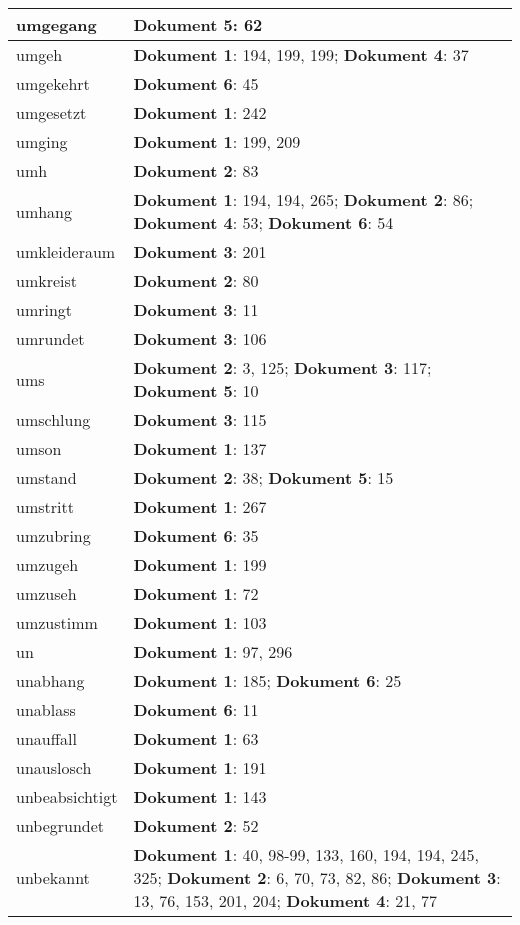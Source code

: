 \documentclass[a5paper]{article}
\begin{document}
\begin{longtable}[l]{|l|p{3in}|}
\hline
umgegang & \textbf{Dokument 5}: 62 \\
\hline
umgeh & \textbf{Dokument 1}: 194, 199, 199; \textbf{Dokument 4}: 37 \\
\hline
umgekehrt & \textbf{Dokument 6}: 45 \\
\hline
umgesetzt & \textbf{Dokument 1}: 242 \\
\hline
umging & \textbf{Dokument 1}: 199, 209 \\
\hline
umh & \textbf{Dokument 2}: 83 \\
\hline
umhang & \textbf{Dokument 1}: 194, 194, 265; \textbf{Dokument 2}: 86; \textbf{Dokument 4}: 53; \textbf{Dokument 6}: 54 \\
\hline
umkleideraum & \textbf{Dokument 3}: 201 \\
\hline
umkreist & \textbf{Dokument 2}: 80 \\
\hline
umringt & \textbf{Dokument 3}: 11 \\
\hline
umrundet & \textbf{Dokument 3}: 106 \\
\hline
ums & \textbf{Dokument 2}: 3, 125; \textbf{Dokument 3}: 117; \textbf{Dokument 5}: 10 \\
\hline
umschlung & \textbf{Dokument 3}: 115 \\
\hline
umson & \textbf{Dokument 1}: 137 \\
\hline
umstand & \textbf{Dokument 2}: 38; \textbf{Dokument 5}: 15 \\
\hline
umstritt & \textbf{Dokument 1}: 267 \\
\hline
umzubring & \textbf{Dokument 6}: 35 \\
\hline
umzugeh & \textbf{Dokument 1}: 199 \\
\hline
umzuseh & \textbf{Dokument 1}: 72 \\
\hline
umzustimm & \textbf{Dokument 1}: 103 \\
\hline
un & \textbf{Dokument 1}: 97, 296 \\
\hline
unabhang & \textbf{Dokument 1}: 185; \textbf{Dokument 6}: 25 \\
\hline
unablass & \textbf{Dokument 6}: 11 \\
\hline
unauffall & \textbf{Dokument 1}: 63 \\
\hline
unauslosch & \textbf{Dokument 1}: 191 \\
\hline
unbeabsichtigt & \textbf{Dokument 1}: 143 \\
\hline
unbegrundet & \textbf{Dokument 2}: 52 \\
\hline
unbekannt & \textbf{Dokument 1}: 40, 98-99, 133, 160, 194, 194, 245, 325; \textbf{Dokument 2}: 6, 70, 73, 82, 86; \textbf{Dokument 3}: 13, 76, 153, 201, 204; \textbf{Dokument 4}: 21, 77 \\

\end{longtable}
\end{document}

